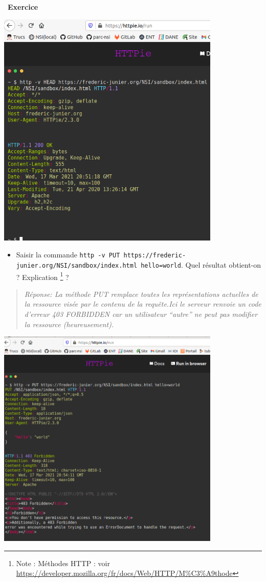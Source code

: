 \documentclass[
  11pt,
]{article}
\newcommand{\passthrough}[1]{#1}
\providecommand{\tightlist}{%
  \setlength{\itemsep}{0pt}\setlength{\parskip}{0pt}}
\newcounter{exo}
\newenvironment{exercice}[1]
{\par \medskip   \addtocounter{exo}{1} \noindent  
\begin{bclogo}[arrondi =0.1,   noborder = true, logo=\bccrayon, marge=4]{~\textbf{Exercice} \textbf{\theexo} {\itshape #1} }  \par}
{
\end{bclogo}
 \par \bigskip }
\begin{document}
\begin{exercice}{}
\begin{enumerate}
  \includegraphics[width=0.8\textwidth,height=\textheight]{images/http_pie2.png}\\

  \begin{itemize}
  \tightlist
  \item
    Saisir la commande
    \passthrough{\lstinline!http -v PUT https://frederic-junier.org/NSI/sandbox/index.html hello=world!}.
    Quel résultat obtient-on ? Explication \footnote{Note : Méthodes
      HTTP : voir
      \url{https://developer.mozilla.org/fr/docs/Web/HTTP/M\%C3\%A9thode}}
    ?
  \end{itemize}

  \begin{quote}
  \emph{Réponse: La méthode PUT remplace toutes les représentations
  actuelles de la ressource visée par le contenu de la requête.Ici le
  serveur renvoie un code d'erreur 403 FORBIDDEN car un utilisateur
  ``autre'' ne peut pas modifier la ressource (heureusement).}
  \end{quote}
\end{enumerate}

\includegraphics[width=0.8\textwidth,height=\textheight]{images/http_pie3.png}\\


\end{exercice}
\end{document}

